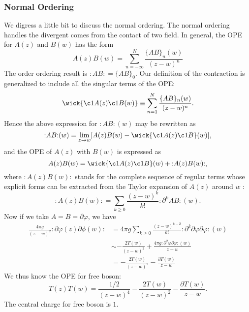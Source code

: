 \documentclass[aps,prb,superscriptaddress,nofootinbib]{revtex4}
\newcommand{\normord}[1]{{:\mathrel{#1}:}}
\begin{document}
\subsubsection{Normal Ordering}
We digress a little bit to discuss the normal ordering.
The normal ordering handles the divergent comes from the contact of two field.
In general, the OPE for $A(z)$ and $B(w)$ has the form
\begin{equation}
	A(z) B(w) = \sum_{n=-\infty}^N \frac{\{AB\}_n(w)}{(z-w)^n}
\end{equation}
The order ordering result is $\normord{AB}=\{AB\}_0$.
Our definition of the contraction is generalized to include all the singular terms of the OPE:
\begin{equation}
	\wick{\c1{A}(z) \c1{B} (w)} \equiv \sum_{n=1}^{N} \frac{\{A B\}_{n}(w)}{(z-w)^{n}}.
\end{equation}
Hence the above expression for $\normord{A B}(w)$ may be rewritten as
\begin{equation}
	\normord{A B}(w) = \lim _{z \rightarrow w}[A(z) B(w)- \wick{\c1 A(z) \c1 B}(w)],
\end{equation}
and the OPE of $A(z)$ with $B(w)$ is expressed as
\begin{equation}
	A(z) B(w) = \wick{\c1 A(z) \c1 B}(w)+ \normord{A(z) B(w)},
\end{equation}
where $\normord{A(z) B(w)}$ stands for the complete sequence of regular terms whose explicit forms can be extracted from the Taylor expansion of $A(z)$ around $w$ :
\begin{equation}
	\normord{A(z) B(w)} = \sum_{k \geq 0} \frac{(z-w)^{k}}{k !}\normord{\partial^{k} A B}(w).
\end{equation}
Now if we take $A=B=\partial\varphi$, we have
\begin{equation}
\begin{aligned}
	 \frac{4\pi g}{(z-w)^2} \normord{\partial\varphi(z) \partial\phi(w)} 
	 &= 4\pi g \sum_{k \geq 0} \frac{(z-w)^{k-2}}{k !}\normord{\partial^{k} \partial\varphi \partial\varphi}(w) \\
	 &\sim - \frac{2T(w)}{(z-w)^2} + \frac{4\pi g \normord{\partial^2\varphi \partial\varphi}(w)}{z-w} \\
	 &= - \frac{2T(w)}{(z-w)^2} - \frac{\partial T(w)}{z-w}
\end{aligned}
\end{equation}
We thus know the OPE for free boson:
\begin{equation}
	T(z) T(w) = \frac{1/2}{(z-w)^4} - \frac{2T(w)}{(z-w)^2} - \frac{\partial T(w)}{z-w}.
\end{equation}
The central charge for free boson is $1$.
\end{document}
